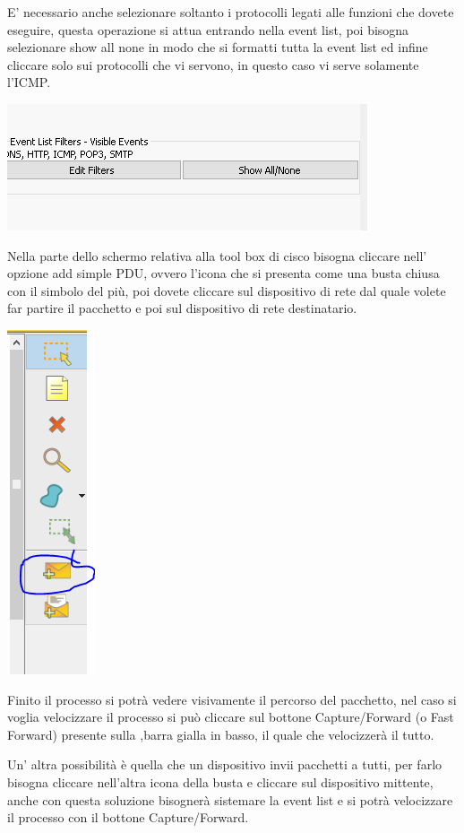 E’ necessario anche selezionare soltanto i protocolli legati alle funzioni che dovete eseguire, questa operazione si attua entrando nella event list, poi bisogna selezionare show all none in modo che si formatti tutta la event list ed infine cliccare solo sui protocolli che vi servono, in questo caso vi serve solamente l'ICMP.

\begin{center}
    \includegraphics[width=\linewidth]{images/04.debugging-rete/05.png}
\end{center}

Nella parte dello schermo relativa alla tool box di cisco bisogna cliccare nell’ opzione add simple PDU, ovvero l'icona che si presenta come una busta chiusa con il simbolo del più, poi dovete cliccare sul dispositivo di rete dal quale volete far partire il pacchetto e poi sul dispositivo di rete destinatario.

\begin{center}
    \includegraphics[width=0.1\linewidth]{images/04.debugging-rete/06.png}
\end{center}

Finito il processo si potrà vedere visivamente il percorso del pacchetto, nel caso si voglia velocizzare il processo si può cliccare sul bottone Capture/Forward (o Fast Forward) presente sulla ,barra gialla in basso, il quale che velocizzerà il tutto.

Un' altra possibilità è quella che un dispositivo invii pacchetti a tutti, per farlo bisogna cliccare nell'altra icona della busta e cliccare sul dispositivo mittente, anche con questa soluzione bisognerà sistemare la event list e si potrà velocizzare il processo con il bottone Capture/Forward.

